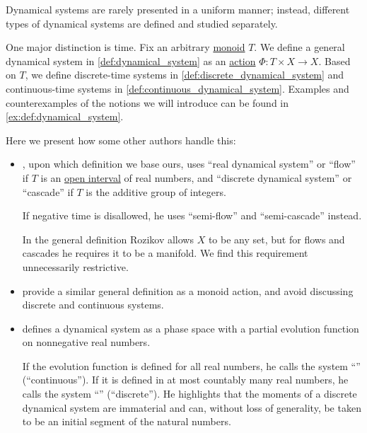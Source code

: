 \begin{remark}\label{rem:dynamical_system_time_etymology}
  Dynamical systems are rarely presented in a uniform manner; instead, different types of dynamical systems are defined and studied separately.

  One major distinction is time. Fix an arbitrary \hyperref[def:monoid]{monoid} \( T \). We define a general dynamical system in \cref{def:dynamical_system} as an \hyperref[def:monoid_action]{action} \( \Phi: T \times X \to X \). Based on \( T \), we define discrete-time systems in \cref{def:discrete_dynamical_system} and continuous-time systems in \cref{def:continuous_dynamical_system}. Examples and counterexamples of the notions we will introduce can be found in \cref{ex:def:dynamical_system}.

  Here we present how some other authors handle this:
  \begin{itemize}
    \item \Textcite[362]{Rozikov2012MultiDimensionalTimeDynamicalSystem}, upon which definition we base ours, uses \enquote{real dynamical system} or \enquote{flow} if \( T \) is an \hyperref[def:order_interval/open]{open interval} of real numbers, and \enquote{discrete dynamical system} or \enquote{cascade} if \( T \) is the additive group of integers.

    If negative time is disallowed, he uses \enquote{semi-flow} and \enquote{semi-cascade} instead.

    In the general definition Rozikov allows \( X \) to be any set, but for flows and cascades he requires it to be a manifold. We find this requirement unnecessarily restrictive.

    \item \Textcite[def. 1]{GiuntiMazzola2012DynamicalSystemsOnMonoids} provide a similar general definition as a monoid action, and avoid discussing discrete and continuous systems.

    \item \Textcite[5]{Юмагулов2015ДинамическиеСистемы} defines a dynamical system as a phase space with a partial evolution function on nonnegative real numbers.

    If the evolution function is defined for all real numbers, he calls the system \enquote{} (\enquote{continuous}). If it is defined in at most countably many real numbers, he calls the system \enquote{} (\enquote{discrete}). He highlights that the moments of a discrete dynamical system are immaterial and can, without loss of generality, be taken to be an initial segment of the natural numbers.


\end{itemize}
\end{remark}
